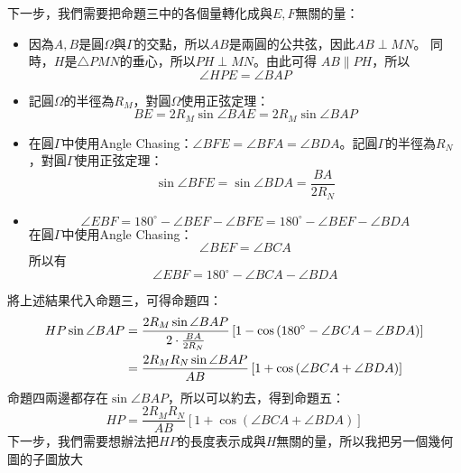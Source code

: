 \documentclass{article}
\begin{document}
下一步，我們需要把命題三中的各個量轉化成與$E,F$無關的量：
\begin{itemize}
  \item 因為$A,B$是圓$\Omega$與$\Gamma$的交點，所以$AB$是兩圓的公共弦，因此$AB\perp MN$。
  同時，$H$是$\triangle{PMN}$的垂心，所以$PH\perp MN$。由此可得 $AB\parallel PH$，所以$$\angle{HPE}=\angle{BAP}$$
  \item 記圓$\Omega$的半徑為$R_M$，對圓$\Omega$使用正弦定理：$$BE=2R_M\sin{\angle{BAE}}=2R_M\sin{\angle{BAP}}$$
  \item 在圓$\Gamma$中使用Angle Chasing：$\angle{BFE}=\angle{BFA}=\angle{BDA}$。記圓$\Gamma$的半徑為$R_N$，對圓$\Gamma$使用正弦定理：
  $$\sin{\angle{BFE}}=\sin{\angle{BDA}}=\frac{BA}{2R_N}$$
  \item $$\angle{EBF}=180^{\circ}-\angle{BEF}-\angle{BFE}=180^{\circ}-\angle{BEF}-\angle{BDA}$$
  在圓$\Gamma$中使用Angle Chasing：$$\angle{BEF}=\angle{BCA}$$
  所以有$$\angle{EBF}=180^{\circ}-\angle{BCA}-\angle{BDA}$$

\end{itemize}
將上述結果代入命題三，可得命題四：
\begin{align}
  HP\sin{\angle{BAP}}&=\frac{2R_M\sin{\angle{BAP}}}{2\cdot\frac{BA}{2R_N}}
  \left[1-\cos{\left(180^{\circ}-\angle{BCA}-\angle{BDA}\right)}\right]\notag\\
  &=\frac{2R_MR_N\sin{\angle{BAP}}}{AB}\left[1+\cos{\left(\angle{BCA}+\angle{BDA}\right)}\right]
\end{align}
命題四兩邊都存在$\sin{\angle{BAP}}$，所以可以約去，得到命題五：
\begin{equation}
  HP=\frac{2R_MR_N}{AB}\left[1+\cos{\left(\angle{BCA}+\angle{BDA}\right)}\right]
\end{equation}
下一步，我們需要想辦法把$HP$的長度表示成與$H$無關的量，所以我把另一個幾何圖的子圖放大
\begin{center} %
\end{center}
\end{document}
